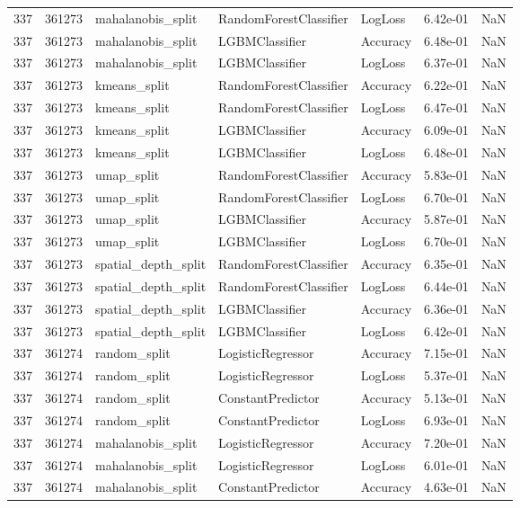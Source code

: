 \begin{tabular}{rrlllrr}
337 & 361273 & mahalanobis\_split & RandomForestClassifier & LogLoss & 6.42e-01 & NaN \\
337 & 361273 & mahalanobis\_split & LGBMClassifier & Accuracy & 6.48e-01 & NaN \\
337 & 361273 & mahalanobis\_split & LGBMClassifier & LogLoss & 6.37e-01 & NaN \\
337 & 361273 & kmeans\_split & RandomForestClassifier & Accuracy & 6.22e-01 & NaN \\
337 & 361273 & kmeans\_split & RandomForestClassifier & LogLoss & 6.47e-01 & NaN \\
337 & 361273 & kmeans\_split & LGBMClassifier & Accuracy & 6.09e-01 & NaN \\
337 & 361273 & kmeans\_split & LGBMClassifier & LogLoss & 6.48e-01 & NaN \\
337 & 361273 & umap\_split & RandomForestClassifier & Accuracy & 5.83e-01 & NaN \\
337 & 361273 & umap\_split & RandomForestClassifier & LogLoss & 6.70e-01 & NaN \\
337 & 361273 & umap\_split & LGBMClassifier & Accuracy & 5.87e-01 & NaN \\
337 & 361273 & umap\_split & LGBMClassifier & LogLoss & 6.70e-01 & NaN \\
337 & 361273 & spatial\_depth\_split & RandomForestClassifier & Accuracy & 6.35e-01 & NaN \\
337 & 361273 & spatial\_depth\_split & RandomForestClassifier & LogLoss & 6.44e-01 & NaN \\
337 & 361273 & spatial\_depth\_split & LGBMClassifier & Accuracy & 6.36e-01 & NaN \\
337 & 361273 & spatial\_depth\_split & LGBMClassifier & LogLoss & 6.42e-01 & NaN \\
337 & 361274 & random\_split & LogisticRegressor & Accuracy & 7.15e-01 & NaN \\
337 & 361274 & random\_split & LogisticRegressor & LogLoss & 5.37e-01 & NaN \\
337 & 361274 & random\_split & ConstantPredictor & Accuracy & 5.13e-01 & NaN \\
337 & 361274 & random\_split & ConstantPredictor & LogLoss & 6.93e-01 & NaN \\
337 & 361274 & mahalanobis\_split & LogisticRegressor & Accuracy & 7.20e-01 & NaN \\
337 & 361274 & mahalanobis\_split & LogisticRegressor & LogLoss & 6.01e-01 & NaN \\
337 & 361274 & mahalanobis\_split & ConstantPredictor & Accuracy & 4.63e-01 & NaN \\

\end{tabular}

